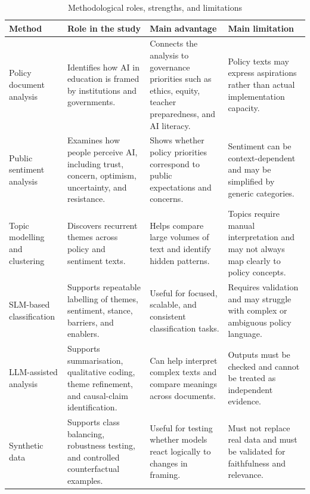 \documentclass{article}
\begin{document}
\begin{table}[h]
\centering
\small
\caption{Methodological roles, strengths, and limitations}
\label{tab:methodological_roles}
\begin{tabular}{L{0.19\textwidth} L{0.27\textwidth} L{0.25\textwidth} L{0.22\textwidth}}
\hline
\textbf{Method} & \textbf{Role in the study} & \textbf{Main advantage} & \textbf{Main limitation} \\
\hline

Policy document analysis &
Identifies how AI in education is framed by institutions and governments. &
Connects the analysis to governance priorities such as ethics, equity, teacher
preparedness, and AI literacy. &
Policy texts may express aspirations rather than actual implementation capacity. \\[.15cm]

Public sentiment analysis &
Examines how people perceive AI, including trust, concern, optimism, uncertainty,
and resistance. &
Shows whether policy priorities correspond to public expectations and concerns. &
Sentiment can be context-dependent and may be simplified by generic categories. \\[.15cm]

Topic modelling and clustering &
Discovers recurrent themes across policy and sentiment texts. &
Helps compare large volumes of text and identify hidden patterns. &
Topics require manual interpretation and may not always map clearly to policy
concepts. \\[.15cm]

SLM-based classification &
Supports repeatable labelling of themes, sentiment, stance, barriers, and
enablers. &
Useful for focused, scalable, and consistent classification tasks. &
Requires validation and may struggle with complex or ambiguous policy language. \\[.15cm]

LLM-assisted analysis &
Supports summarisation, qualitative coding, theme refinement, and causal-claim
identification. &
Can help interpret complex texts and compare meanings across documents. &
Outputs must be checked and cannot be treated as independent evidence. \\[.15cm]

Synthetic data &
Supports class balancing, robustness testing, and controlled counterfactual
examples. &
Useful for testing whether models react logically to changes in framing. &
Must not replace real data and must be validated for faithfulness and relevance. \\[.15cm]


\end{tabular}
\end{table}
\end{document}
